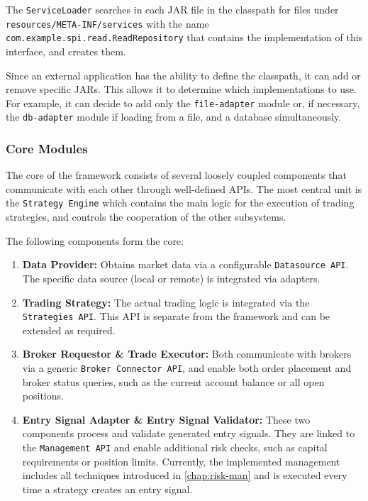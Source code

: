 The \texttt{ServiceLoader} searches in each JAR file in the classpath for files under \\\texttt{resources/META-INF/services} with the name \texttt{com.example.spi.read.}\texttt{ReadRepository} that contains the implementation of this interface, and creates them.

Since an external application has the ability to define the classpath, it can add or remove specific JARs.
This allows it to determine which implementations to use.
For example, it can decide to add only the \texttt{file-adapter} module or, if necessary, the \texttt{db-adapter} module if loading from a file, and a database simultaneously.

\subsubsection{Core Modules}

The core of the framework consists of several loosely coupled components that communicate with each other through well-defined APIs.
The most central unit is the \texttt{Strategy Engine} which contains the main logic for the execution of trading strategies, and controls the cooperation of the other subsystems.

The following components form the core:

\begin{enumerate}
    \item \textbf{Data Provider:} Obtains market data via a configurable \texttt{Datasource API}.
    The specific data source (local or remote) is integrated via adapters.
    \item \textbf{Trading Strategy:} The actual trading logic is integrated via the \texttt{Strategies API}.
    This API is separate from the framework and can be extended as required.
    \item \textbf{Broker Requestor \& Trade Executor:} Both communicate with brokers via a generic \texttt{Broker Connector API}, and enable both order placement and broker status queries, such as the current account balance or all open positions.
    \newpage
    \item \textbf{Entry Signal Adapter \& Entry Signal Validator:} These two components process and validate generated entry signals.
    They are linked to the \texttt{Management API} and enable additional risk checks, such as capital requirements or position limits.
    Currently, the implemented management includes all techniques introduced in \autoref{chap:risk-man} and is executed every time a strategy creates an entry signal.
\end{enumerate}

